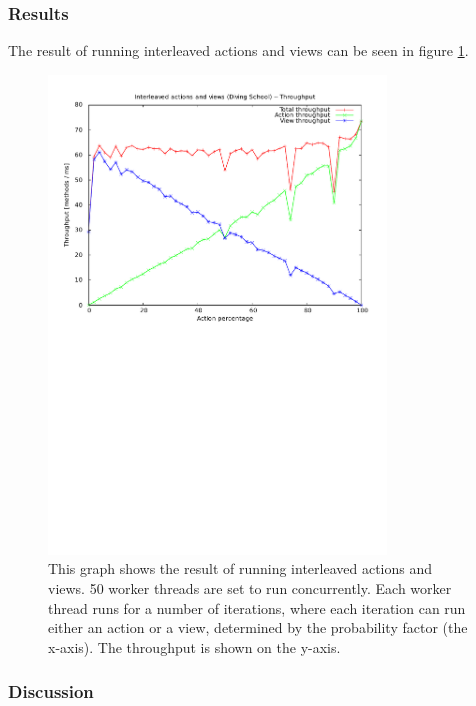\subsubsection{Results}

The result of running interleaved actions and views can be seen in
figure \ref{fig:interleavedActionsAndViewsThroughput}.

\begin{figure}[h!]
\centering
\includegraphics[width=0.8\textwidth, trim=0 15cm 0 1cm] {img/interleavedActionsAndViewsThroughput.pdf}
\caption{This graph shows the result of running interleaved actions and views. 50 worker threads are set to run concurrently. Each worker thread runs for a number of iterations, where each iteration can run either an action or a view, determined by the probability factor (the x-axis). The throughput is shown on the y-axis.}
\label{fig:interleavedActionsAndViewsThroughput}
\end{figure}


\subsubsection{Discussion}

